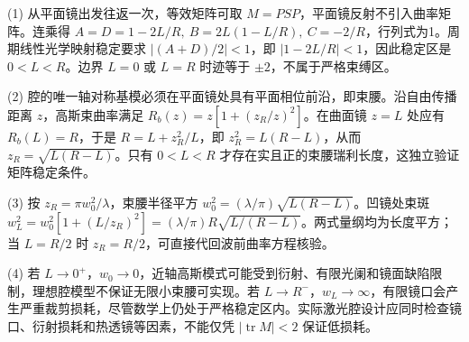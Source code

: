 (1) 从平面镜出发往返一次，等效矩阵可取 \(M=PSP\)，平面镜反射不引入曲率矩阵。连乘得 \(A=D=1-2L/R,\ B=2L(1-L/R),\ C=-2/R\)，行列式为1。周期线性光学映射稳定要求 \(|(A+D)/2|<1\)，即 \(|1-2L/R|<1\)，因此稳定区是 \(0<L<R\)。边界 \(L=0\) 或 \(L=R\) 时迹等于 \(\pm2\)，不属于严格束缚区。

(2) 腔的唯一轴对称基模必须在平面镜处具有平面相位前沿，即束腰。沿自由传播距离 \(z\)，高斯束曲率满足 \(R_b(z)=z[1+(z_R/z)^2]\)。在曲面镜 \(z=L\) 处应有 \(R_b(L)=R\)，于是 \(R=L+z_R^2/L\)，即 \(z_R^2=L(R-L)\)，从而 \(z_R=\sqrt{L(R-L)}\)。只有 \(0<L<R\) 才存在实且正的束腰瑞利长度，这独立验证矩阵稳定条件。

(3) 按 \(z_R=\pi w_0^2/\lambda\)，束腰半径平方 \(w_0^2=(\lambda/\pi)\sqrt{L(R-L)}\)。凹镜处束斑 \(w_L^2=w_0^2[1+(L/z_R)^2]=(\lambda/\pi)R\sqrt{L/(R-L)}\)。两式量纲均为长度平方；当 \(L=R/2\) 时 \(z_R=R/2\)，可直接代回波前曲率方程核验。

(4) 若 \(L\to0^+\)，\(w_0\to0\)，近轴高斯模式可能受到衍射、有限光阑和镜面缺陷限制，理想腔模型不保证无限小束腰可实现。若 \(L\to R^-\)，\(w_L\to\infty\)，有限镜口会产生严重裁剪损耗，尽管数学上仍处于严格稳定区内。实际激光腔设计应同时检查镜口、衍射损耗和热透镜等因素，不能仅凭 \(|\operatorname{tr}M|<2\) 保证低损耗。
